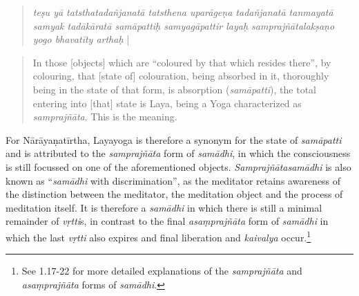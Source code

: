 \begin{quote}
\textit{teṣu yā tatsthatadañjanatā tatsthena uparāgeṇa tadañjanatā tanmayatā samyak tadākāratā samāpattiḥ samyagāpattir layaḥ samprajñātalakṣaṇo yogo bhavatīty arthaḥ} |
\end{quote}
\begin{quote}
In those [objects] which are ``coloured by that which resides there'', by colouring, that [state of] colouration, being absorbed in it, thoroughly being in the state of that form, is absorption (\textit{samāpatti}), the total entering into [that] state is Laya, being a Yoga characterized as \textit{samprajñāta}. This is the meaning.
\end{quote}

For Nārāyaṇatīrtha, Layayoga is therefore a synonym for the state of \textit{samāpatti} and is attributed to the \textit{samprajñāta} form of \textit{samādhi}, in which the consciousness is still focussed on one of the aforementioned objects. \textit{Samprajñātasamādhi} is also known as ``\textit{samādhi} with discrimination'', as the meditator retains awareness of the distinction between the meditator, the meditation object and the process of meditation itself. It is therefore a \textit{samādhi} in which there is still a minimal remainder of \textit{vṛtti}s, in contrast to the final \textit{asaṃprajñāta} form of \textit{samādhi} in which the last \textit{vṛtti} also expires and final liberation and \textit{kaivalya} occur.\footnote{See  1.17-22 for more detailed explanations of the \textit{samprajñāta} and \textit{asaṃprajñāta} forms of \textit{samādhi}.}

